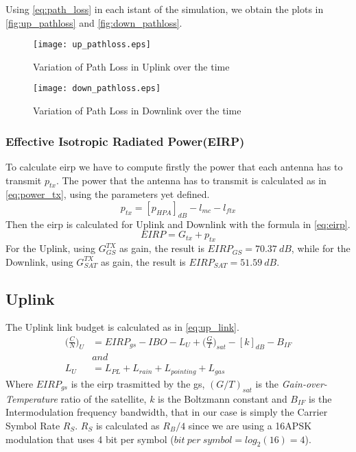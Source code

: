 		Using \autoref{eq:path_loss} in each istant of the simulation, we obtain the plots in \autoref{fig:up_pathloss} and \autoref{fig:down_pathloss}.

		\begin{figure}[ht]
			\begin{minipage}{.5\textwidth}
			\centering
			\texttt{[image: up\_pathloss.eps]}
			\caption{Variation of Path Loss in Uplink over the time}
			\label{fig:up_pathloss}
			\end{minipage}\hspace{0.5cm}
			\begin{minipage}{.5\textwidth}
			\centering
			\texttt{[image: down\_pathloss.eps]}
			\caption{Variation of Path Loss in Downlink over the time}
			\label{fig:down_pathloss}
			\end{minipage}
		\end{figure}
	\subsubsection{Effective Isotropic Radiated Power(EIRP)}
	To calculate \gls{eirp} we have to compute firstly the power that each antenna has to transmit $p_{tx}$.
	The power that the antenna has to transmit is calculated as in \autoref{eq:power_tx}, using the parameters yet defined.
	\begin{equation}\label{eq:power_tx}
		p_{tx} = [p_{HPA}]_{dB} - l_{mc} - l_{ftx}
	\end{equation}
	Then the \gls{eirp} is calculated for Uplink and Downlink with the formula in \autoref{eq:eirp}.
	\begin{equation}\label{eq:eirp}
		EIRP = G_{tx} + p_{tx}
	\end{equation}
	For the Uplink, using $G_{GS}^{TX}$ as gain, the result is $EIRP_{GS} = 70.37 ~dB$, while for the Downlink, using $G_{SAT}^{TX}$ as gain, the result is $EIRP_{SAT} = 51.59 ~dB$.
\subsection{Uplink}
	The Uplink link budget is calculated as in \autoref{eq:up_link}.
	\begin{equation} \label{eq:up_link}
		\begin{split}
			\bigg(\frac{C}{N}\bigg)_U &= EIRP_{gs} - IBO - L_U + \bigg(\frac{G}{T}\bigg)_{sat} - [k]_{dB} - B_{IF}\\
			&and\\
			L_U &= L_{PL} + L_{rain} + L_{pointing} + L_{gas}
		\end{split}
	\end{equation}
	Where $EIRP_{gs}$ is the \gls{eirp} trasmitted by the \gls{gs}, $(G/T)_{sat}$ is the \textit{Gain-over-Temperature} ratio of the satellite, $k$ is the Boltzmann constant and $B_{IF}$ is the Intermodulation frequency bandwidth, that in our case is simply the Carrier Symbol Rate $R_S$.
	$R_S$ is calculated as $R_B/4$ since we are using a 16APSK modulation that uses 4 bit per symbol ($bit ~per ~symbol = log_2(16) = 4$).

